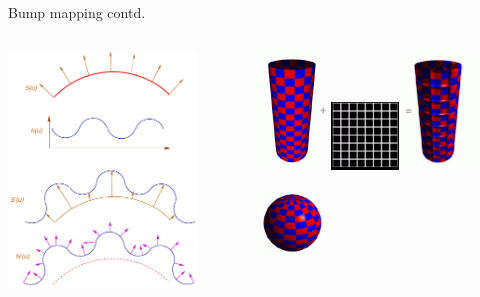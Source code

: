 \documentclass[9pt]{beamer}
\begin{document}
\begin{frame}{Bump mapping contd.}
	
	\begin{columns}[t]
		\begin{column}{7cm}
			\begin{center}
				\includegraphics[width=5cm]{slike/03_bump_mapping.png}
			\end{center}
		\end{column}
		\begin{column}{5cm}
			\begin{center}
				\includegraphics[width=1.8cm]{slike/bump_01.png}
				\includegraphics[width=1.8cm]{slike/bump_02.png}
				\includegraphics[width=1.8cm]{slike/bump_03.png}
			\end{center}
			\begin{center}
				\includegraphics[width=1.8cm]{slike/bump_01_01.png}

\end{center}
\end{column}
\end{columns}
\end{frame}
\end{document}
